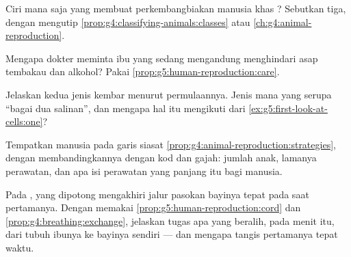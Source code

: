 \begin{exercise}[$\star$]\label{exo:g5:human-reproduction:7}
Ciri mana saja yang membuat perkembangbiakan manusia khas ?
Sebutkan tiga, dengan mengutip
\cref{prop:g4:classifying-animals:classes} atau
\cref{ch:g4:animal-reproduction}.
\end{exercise}

\begin{exercise}[$\star$]\label{exo:g5:human-reproduction:8}
Mengapa dokter meminta ibu yang sedang mengandung menghindari asap
tembakau dan alkohol? Pakai \cref{prop:g5:human-reproduction:care}.
\end{exercise}

\begin{exercise}[$\star\star$]\label{exo:g5:human-reproduction:9}
Jelaskan kedua jenis kembar menurut permulaannya. Jenis mana yang
serupa ``bagai dua salinan'', dan mengapa hal itu mengikuti dari
\cref{ex:g5:first-look-at-cells:one}?
\end{exercise}

\begin{exercise}[$\star\star$]\label{exo:g5:human-reproduction:10}
Tempatkan manusia pada garis siasat
\cref{prop:g4:animal-reproduction:strategies}, dengan membandingkannya
dengan  kod dan gajah: jumlah anak, lamanya perawatan, dan apa isi
perawatan yang panjang itu bagi manusia.
\end{exercise}

\begin{exercise}[$\star\star\star$]\label{exo:g5:human-reproduction:11}
Pada ,  yang dipotong mengakhiri jalur pasokan
bayinya tepat pada saat   pertamanya. Dengan
memakai \cref{prop:g5:human-reproduction:cord} dan
\cref{prop:g4:breathing:exchange}, jelaskan tugas apa yang beralih,
pada menit itu, dari tubuh ibunya ke  bayinya sendiri --- dan
mengapa tangis pertamanya tepat waktu.
\end{exercise}

